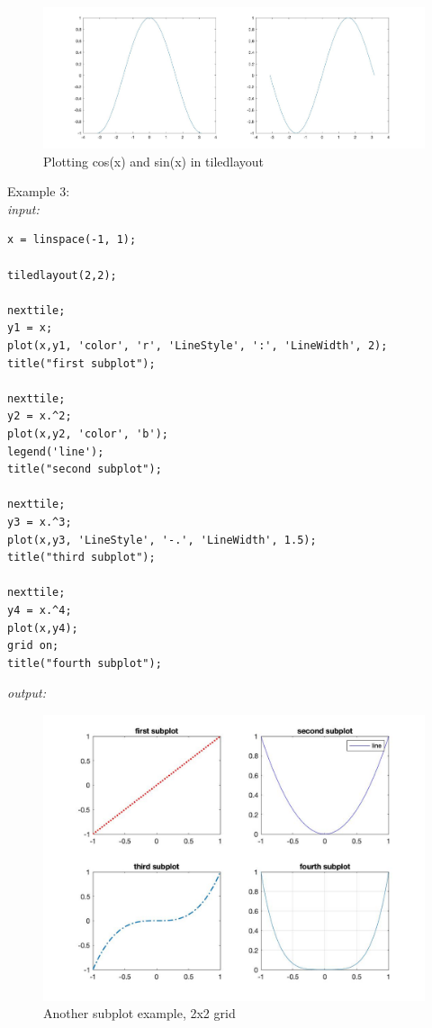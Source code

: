\documentclass[../MATLAB_Primer.tex]{subfiles}
\begin{document}
\begin{figure}[H]
    \centering
    \includegraphics[width=350pt]{images/plotting_example5'.jpg}
    \caption{Plotting cos(x) and sin(x) in tiledlayout}
    \label{fig:plotting_example5'}
\end{figure}

Example 3:\\

\textit{input:}
\begin{lstlisting}
x = linspace(-1, 1);

tiledlayout(2,2);

nexttile;
y1 = x;
plot(x,y1, 'color', 'r', 'LineStyle', ':', 'LineWidth', 2);
title("first subplot");

nexttile;
y2 = x.^2;
plot(x,y2, 'color', 'b');
legend('line');
title("second subplot");

nexttile;
y3 = x.^3;
plot(x,y3, 'LineStyle', '-.', 'LineWidth', 1.5);
title("third subplot");

nexttile;
y4 = x.^4;
plot(x,y4);
grid on;
title("fourth subplot");
\end{lstlisting}
\textit{output:}

\begin{figure}[H]
    \centering
    \includegraphics[width=350pt]{images/plotting_example6.jpg}
    \caption{Another subplot example, 2x2 grid}
    \label{fig:plotting_example6}
\end{figure}
\end{document}
